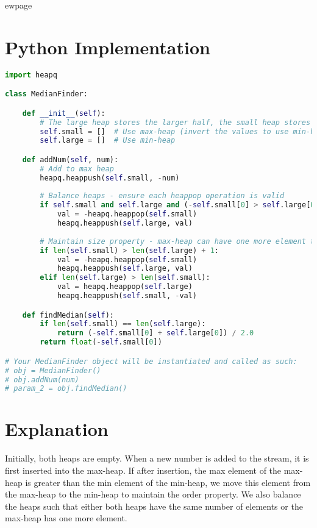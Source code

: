 ewpage
\section*{Python Implementation}
\begin{fullwidth}
\begin{lstlisting}[language=Python]
import heapq

class MedianFinder:

    def __init__(self):
        # The large heap stores the larger half, the small heap stores the smaller half
        self.small = []  # Use max-heap (invert the values to use min-heap in Python)
        self.large = []  # Use min-heap

    def addNum(self, num):
        # Add to max heap
        heapq.heappush(self.small, -num)
        
        # Balance heaps - ensure each heappop operation is valid
        if self.small and self.large and (-self.small[0] > self.large[0]):
            val = -heapq.heappop(self.small)
            heapq.heappush(self.large, val)
            
        # Maintain size property - max-heap can have one more element than min-heap
        if len(self.small) > len(self.large) + 1:
            val = -heapq.heappop(self.small)
            heapq.heappush(self.large, val)
        elif len(self.large) > len(self.small):
            val = heapq.heappop(self.large)
            heapq.heappush(self.small, -val)

    def findMedian(self):
        if len(self.small) == len(self.large):
            return (-self.small[0] + self.large[0]) / 2.0
        return float(-self.small[0])

# Your MedianFinder object will be instantiated and called as such:
# obj = MedianFinder()
# obj.addNum(num)
# param_2 = obj.findMedian()
\end{lstlisting}

\end{fullwidth}

\section*{Explanation}
Initially, both heaps are empty. When a new number is added to the stream, it is first inserted into the max-heap. If after insertion, the max element of the max-heap is greater than the min element of the min-heap, we move this element from the max-heap to the min-heap to maintain the order property. We also balance the heaps such that either both heaps have the same number of elements or the max-heap has one more element.

